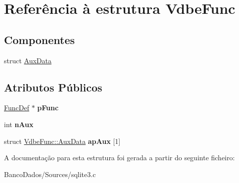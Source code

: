 \hypertarget{struct_vdbe_func}{\section{Referência à estrutura Vdbe\-Func}
\label{struct_vdbe_func}
}
\subsection*{Componentes}
\begin{DoxyCompactItemize}
\item 
struct \hyperlink{struct_vdbe_func_1_1_aux_data}{Aux\-Data}
\end{DoxyCompactItemize}
\subsection*{Atributos Públicos}
\begin{DoxyCompactItemize}
\item 
\hypertarget{struct_vdbe_func_a73cbc96029bec2f37c7e2a79052a2f65}{\hyperlink{struct_func_def}{Func\-Def} $\ast$ {\bfseries p\-Func}}\label{struct_vdbe_func_a73cbc96029bec2f37c7e2a79052a2f65}

\item 
\hypertarget{struct_vdbe_func_ad78feda4c310ea0bc17b7bba53bccd3c}{int {\bfseries n\-Aux}}\label{struct_vdbe_func_ad78feda4c310ea0bc17b7bba53bccd3c}

\item 
\hypertarget{struct_vdbe_func_abb466d61a0d36b913418460e5922166a}{struct \hyperlink{struct_vdbe_func_1_1_aux_data}{Vdbe\-Func\-::\-Aux\-Data} {\bfseries ap\-Aux} \mbox{[}1\mbox{]}}\label{struct_vdbe_func_abb466d61a0d36b913418460e5922166a}

\end{DoxyCompactItemize}


A documentação para esta estrutura foi gerada a partir do seguinte ficheiro\-:\begin{DoxyCompactItemize}
\item 
Banco\-Dados/\-Sources/sqlite3.\-c\end{DoxyCompactItemize}
